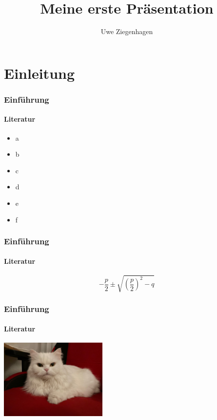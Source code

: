 \documentclass[ngerman,14pt]{beamer}
\author{Uwe Ziegenhagen}
\title{Meine erste Präsentation}
\institute{DANTE e.V. Heidelberg}
\begin{document}
\begin{frame}

\maketitle


\end{frame}

\begin{frame}

\tableofcontents

\end{frame}



\section{Einleitung}

\begin{frame}
\frametitle{Einführung}
\framesubtitle{Literatur}

\begin{itemize}
	\item a
	\item b
	\item c
	\item d
	\item e
	\item f
\end{itemize}

\end{frame}

\begin{frame}
\frametitle{Einführung}
\framesubtitle{Literatur}


{\huge
\begin{equation}
-\frac{p}{2} \pm \sqrt{ \left( \frac{p}{2} \right)^2 - q }
\end{equation}}

\end{frame}

\begin{frame}
\frametitle{Einführung}
\framesubtitle{Literatur}

\begin{center}
\includegraphics[width=0.4\textwidth,angle=40]{Bilder/Katze2}
\end{center}

\end{frame}
\end{document}
